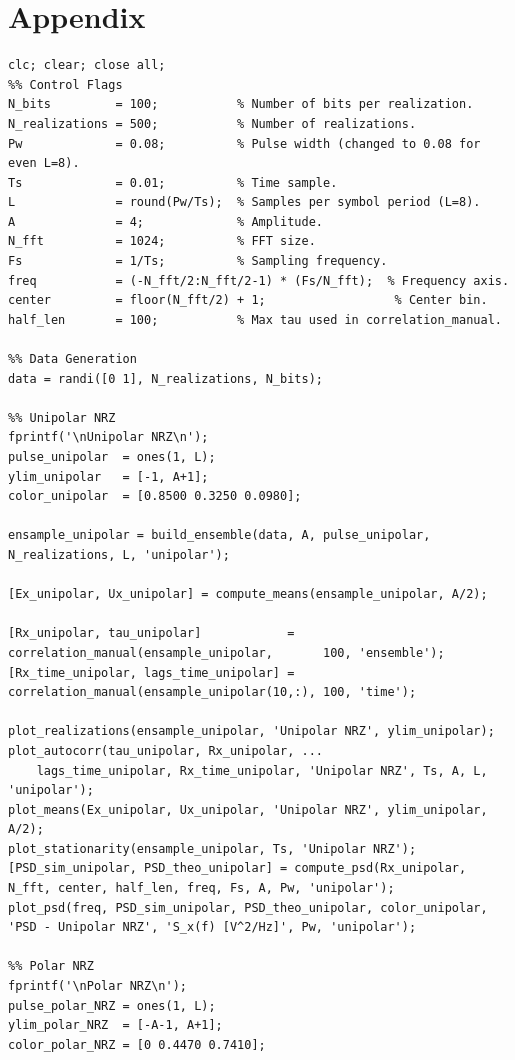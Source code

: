 \chapter{Appendix}

\begin{longlisting}
\begin{verbatim}
clc; clear; close all;
%% Control Flags
N_bits         = 100;           % Number of bits per realization.
N_realizations = 500;           % Number of realizations.
Pw             = 0.08;          % Pulse width (changed to 0.08 for even L=8).
Ts             = 0.01;          % Time sample.
L              = round(Pw/Ts);  % Samples per symbol period (L=8).
A              = 4;             % Amplitude.
N_fft          = 1024;          % FFT size.
Fs             = 1/Ts;          % Sampling frequency.
freq           = (-N_fft/2:N_fft/2-1) * (Fs/N_fft);  % Frequency axis.
center         = floor(N_fft/2) + 1;                  % Center bin.
half_len       = 100;           % Max tau used in correlation_manual.

%% Data Generation
data = randi([0 1], N_realizations, N_bits);

%% Unipolar NRZ
fprintf('\nUnipolar NRZ\n');
pulse_unipolar  = ones(1, L);
ylim_unipolar   = [-1, A+1];
color_unipolar  = [0.8500 0.3250 0.0980];

ensample_unipolar = build_ensemble(data, A, pulse_unipolar, N_realizations, L, 'unipolar');

[Ex_unipolar, Ux_unipolar] = compute_means(ensample_unipolar, A/2);

[Rx_unipolar, tau_unipolar]            = correlation_manual(ensample_unipolar,       100, 'ensemble');
[Rx_time_unipolar, lags_time_unipolar] = correlation_manual(ensample_unipolar(10,:), 100, 'time');

plot_realizations(ensample_unipolar, 'Unipolar NRZ', ylim_unipolar);
plot_autocorr(tau_unipolar, Rx_unipolar, ...
    lags_time_unipolar, Rx_time_unipolar, 'Unipolar NRZ', Ts, A, L, 'unipolar');
plot_means(Ex_unipolar, Ux_unipolar, 'Unipolar NRZ', ylim_unipolar, A/2);
plot_stationarity(ensample_unipolar, Ts, 'Unipolar NRZ');
[PSD_sim_unipolar, PSD_theo_unipolar] = compute_psd(Rx_unipolar, N_fft, center, half_len, freq, Fs, A, Pw, 'unipolar');
plot_psd(freq, PSD_sim_unipolar, PSD_theo_unipolar, color_unipolar, 'PSD - Unipolar NRZ', 'S_x(f) [V^2/Hz]', Pw, 'unipolar');

%% Polar NRZ
fprintf('\nPolar NRZ\n');
pulse_polar_NRZ = ones(1, L);
ylim_polar_NRZ  = [-A-1, A+1];
color_polar_NRZ = [0 0.4470 0.7410];


\end{verbatim}
\end{longlisting}
